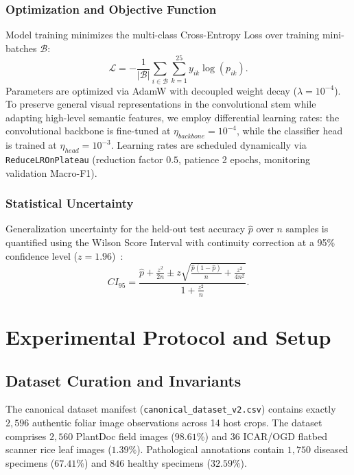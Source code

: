 \documentclass[conference]{IEEEtran}
\begin{document}
\subsubsection{Optimization and Objective Function}
Model training minimizes the multi-class Cross-Entropy Loss over training mini-batches $\mathcal{B}$:
\begin{equation}
\mathcal{L} = -\frac{1}{|\mathcal{B}|} \sum_{i \in \mathcal{B}} \sum_{k=1}^{25} y_{ik} \log(p_{ik}).
\end{equation}
Parameters are optimized via AdamW with decoupled weight decay ($\lambda = 10^{-4}$). To preserve general visual representations in the convolutional stem while adapting high-level semantic features, we employ differential learning rates: the convolutional backbone is fine-tuned at $\eta_{backbone} = 10^{-4}$, while the classifier head is trained at $\eta_{head} = 10^{-3}$. Learning rates are scheduled dynamically via \texttt{ReduceLROnPlateau} (reduction factor $0.5$, patience 2 epochs, monitoring validation Macro-F1).

\subsubsection{Statistical Uncertainty}
Generalization uncertainty for the held-out test accuracy $\hat{p}$ over $n$ samples is quantified using the Wilson Score Interval with continuity correction at a 95\% confidence level ($z = 1.96$)~\cite{wilson1927confidence}:
\begin{equation}
CI_{95} = \frac{\hat{p} + \frac{z^2}{2n} \pm z \sqrt{\frac{\hat{p}(1 - \hat{p})}{n} + \frac{z^2}{4n^2}}}{1 + \frac{z^2}{n}}.
\end{equation}

\section{Experimental Protocol and Setup}

\subsection{Dataset Curation and Invariants}
The canonical dataset manifest (\texttt{canonical\_dataset\_v2.csv}) contains exactly $2,596$ authentic foliar image observations across 14 host crops. The dataset comprises $2,560$ PlantDoc field images ($98.61\%$) and $36$ ICAR/OGD flatbed scanner rice leaf images ($1.39\%$). Pathological annotations contain $1,750$ diseased specimens ($67.41\%$) and $846$ healthy specimens ($32.59\%$).
\end{document}
